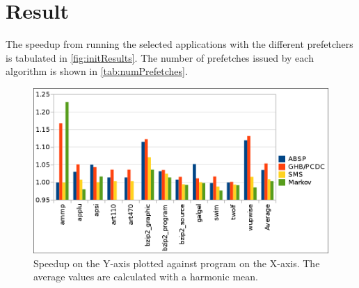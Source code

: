 
\section{Result}
\label{sec:result}

The speedup from running the selected applications with the different
prefetchers is tabulated in \autoref{fig:initResults}. The number of
prefetches issued by each algorithm is shown in
\autoref{tab:numPrefetches}.

\begin{figure}[ht]
  \centering
  \includegraphics[scale=0.25]{figures/init_results.png}
  \caption{\label{fig:initResults} Speedup on the Y-axis plotted
    against program on the X-axis. The average values are calculated
    with a harmonic mean.}
\end{figure}

